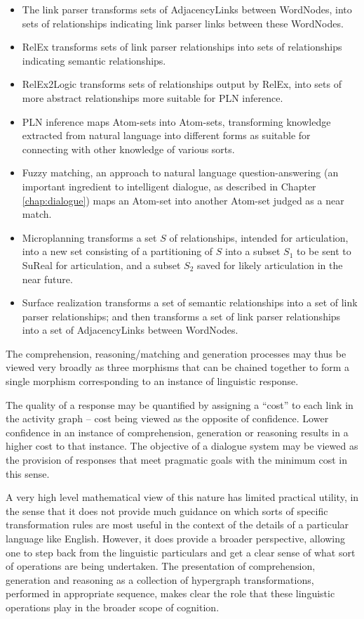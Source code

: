 \begin{itemize}
\item The link parser transforms sets of AdjacencyLinks between WordNodes, into sets of relationships indicating link parser links between these WordNodes.
\item RelEx transforms sets of link parser relationships into sets of relationships indicating semantic relationships.
\item RelEx2Logic transforms sets of relationships output by RelEx, into sets of more abstract relationships more suitable for PLN inference.
\item PLN inference maps Atom-sets into Atom-sets, transforming knowledge extracted from natural language into different forms as suitable for connecting with other knowledge of various sorts.
\item Fuzzy matching, an approach to natural language question-answering (an important ingredient to intelligent dialogue, as described in Chapter \ref{chap:dialogue}) maps an Atom-set into another Atom-set judged as a near match.
\item Microplanning transforms a set $S$ of relationships, intended for articulation, into a new set consisting of a partitioning of $S$ into a subset $S_1$ to be sent to SuReal for articulation, and a subset $S_2$ saved for likely articulation in the near future.
\item Surface realization transforms a set of semantic relationships into a set of link parser relationships; and then transforms a set of link parser relationships into a set of AdjacencyLinks between WordNodes.
\end{itemize}

The comprehension, reasoning/matching and generation processes may thus be viewed very broadly as three  morphisms that can be chained together to form a single morphism corresponding to an instance of linguistic response.

The quality of a response may be quantified by assigning a ``cost'' to each link in the activity graph -- cost being viewed as the opposite of confidence.  Lower confidence in an instance of comprehension, generation or reasoning results in a higher cost to that instance.   The objective of a dialogue system may be viewed as the provision of responses that meet pragmatic goals with the minimum cost in this sense.

A very high level mathematical view of this nature has limited practical utility, in the sense that it does not provide much guidance on which sorts of specific transformation rules are most useful in the context of the details of a particular language like English.   However, it does provide a broader perspective, allowing one to step back from the linguistic particulars and get a clear sense of what sort of operations are being undertaken.   The presentation of comprehension, generation and reasoning as a collection of hypergraph transformations, performed in appropriate sequence, makes clear the role that these linguistic operations play in the broader scope of cognition.

